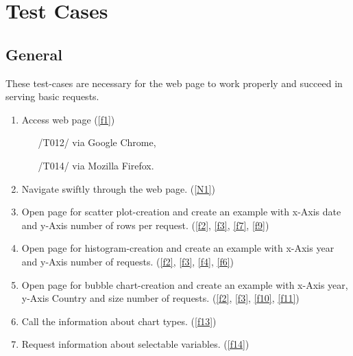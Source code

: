 \section{Test Cases}



\subsection{General}

These test-cases are necessary for the web page to work 
properly and succeed in serving basic requests.

\begin{enumerate}[label={{/T}\itemnumber*{/}}, series=test]

\item Access web page (\ref{f1})
\begin{enumerate}
  \item[/T012/] via Google Chrome,
  \item[/T014/] via Mozilla Firefox.
\end{enumerate}
\label{t10}

\item Navigate swiftly through the web page. (\ref{N1}) 
\label{t11}

\item Open page for \gls{scatter plot}-creation and create an example
      with x-Axis date and y-Axis number of rows per request. (\ref{f2}, \ref{f3}, \ref{f7}, \ref{f9})
\label{t12}

\item Open page for \gls{histogram}-creation and create an example
      with x-Axis year and y-Axis number of requests. (\ref{f2}, \ref{f3}, \ref{f4}, \ref{f6})
\label{t13}

\item Open page for \gls{bubble chart}-creation and create an example
      with x-Axis year, y-Axis Country and size number of requests. (\ref{f2}, \ref{f3}, \ref{f10}, \ref{f11})
\label{t14}

\item Call the information about \gls{chart} types. (\ref{f13})
\label{t15}

\item Request information about selectable variables. (\ref{f14})
\label{t16}

\end{enumerate}

